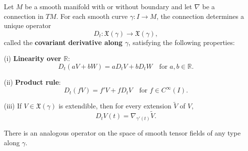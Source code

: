 \begin{theorem}
\label{thm:covariant-derivative-along-curve}
Let $M$ be a smooth manifold with or without boundary and let $\nabla$ be a connection in $TM$. For each smooth curve $\gamma : I \to M$, the connection determines a unique operator
\[
D_t : \mathfrak{X}(\gamma) \to \mathfrak{X}(\gamma),
\]
called the \textbf{covariant derivative along $\gamma$}, satisfying the following properties:

(i) \textbf{Linearity over $\mathbb{R}$}:
\[
D_t(aV + bW) = aD_tV + bD_tW \quad \text{for } a, b \in \mathbb{R}.
\]

(ii) \textbf{Product rule}:
\[
D_t(fV) = f'V + fD_tV \quad \text{for } f \in C^{\infty}(I).
\]

(iii) If $V \in \mathfrak{X}(\gamma)$ is extendible, then for every extension $\tilde{V}$ of $V$,
\[
D_tV(t) = \nabla_{\gamma'(t)}\tilde{V}.
\]

There is an analogous operator on the space of smooth tensor fields of any type along $\gamma$.
\end{theorem}

